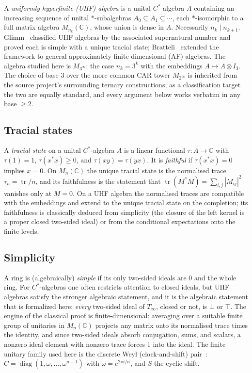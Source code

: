 \documentclass[11pt,a4paper]{amsart}
\theoremstyle{plain}
\theoremstyle{definition}
\newcommand{\Tinf}{T_\infty}
\begin{document}
A \emph{uniformly hyperfinite (UHF) algebra} is a unital $C^*$-algebra $A$
containing an increasing sequence of unital $*$-subalgebras
$A_0 \subseteq A_1 \subseteq \cdots$, each $*$-isomorphic to a full matrix
algebra $M_{n_k}(\mathbb{C})$, whose union is dense in $A$. Necessarily
$n_k \mid n_{k+1}$. Glimm~\cite{glimm1960} classified UHF algebras by the
associated supernatural number and proved each is simple with a unique
tracial state; Bratteli~\cite{bratteli1972} extended the framework to
general approximately finite-dimensional (AF) algebras. The algebra
studied here is $M_{3^\infty}$: the case $n_k = 3^k$ with the embeddings
$A \mapsto A \otimes I_3$. The choice of base 3 over the more common CAR
tower $M_{2^\infty}$ is inherited from the source project's surrounding
ternary constructions; as a classification target the two are equally
standard, and every argument below works verbatim in any base $\ge 2$.

\subsection{Tracial states}

A \emph{tracial state} on a unital $C^*$-algebra $A$ is a linear
functional $\tau \colon A \to \mathbb{C}$ with $\tau(1) = 1$,
$\tau(x^*x) \ge 0$, and $\tau(xy) = \tau(yx)$. It is \emph{faithful} if
$\tau(x^*x) = 0$ implies $x = 0$. On $M_n(\mathbb{C})$ the unique tracial
state is the normalised trace $\tau_n = \operatorname{tr}/n$, and its
faithfulness is the statement that
$\operatorname{tr}(M^*M) = \sum_{i,j}|M_{ij}|^2$ vanishes only at
$M = 0$. On a UHF algebra the normalised traces are compatible with the
embeddings and extend to the unique tracial state on the completion; its
faithfulness is classically deduced from simplicity (the closure of the
left kernel is a proper closed two-sided ideal) or from the conditional
expectations onto the finite levels.

\subsection{Simplicity}

A ring is (algebraically) \emph{simple} if its only two-sided ideals are
$0$ and the whole ring. For $C^*$-algebras one often restricts attention
to closed ideals, but UHF algebras satisfy the stronger algebraic
statement, and it is the algebraic statement that is formalized here:
\emph{every} two-sided ideal of $\Tinf$, closed or not, is $\bot$ or
$\top$. The engine of the classical proof is finite-dimensional: averaging
over a suitable finite group of unitaries in $M_n(\mathbb{C})$ projects
any matrix onto its normalised trace times the identity, and since
two-sided ideals absorb conjugation, sums, and scalars, a nonzero ideal
element with nonzero trace forces $1$ into the ideal. The finite unitary
family used here is the discrete Weyl (clock-and-shift)
pair~\cite{weyl1927}: $C = \operatorname{diag}(1, \omega, \dots,
\omega^{n-1})$ with $\omega = e^{2\pi i/n}$, and $S$ the cyclic shift.
\end{document}
